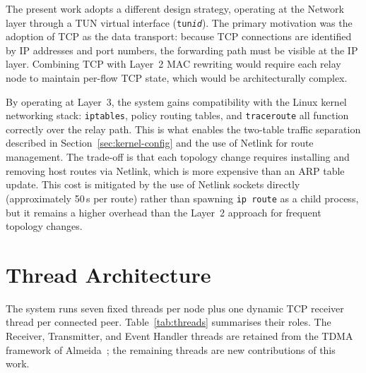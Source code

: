The present work adopts a different design strategy, operating at the Network layer through
a TUN virtual interface (\texttt{tun\textit{id}}). The primary motivation was the adoption
of TCP as the data transport: because TCP connections are identified by IP addresses and
port numbers, the forwarding path must be visible at the IP layer. Combining TCP with
Layer~2 MAC rewriting would require each relay node to maintain per-flow TCP state, which
would be architecturally complex.

By operating at Layer~3, the system gains compatibility with the Linux kernel networking
stack: \texttt{iptables}, policy routing tables, and \texttt{traceroute} all function
correctly over the relay path. This is what enables the two-table traffic separation
described in Section~\ref{sec:kernel-config} and the use of Netlink for route management.
The trade-off is that each topology change requires installing and removing host routes via
Netlink, which is more expensive than an ARP table update. This cost is mitigated by the
use of Netlink sockets directly (approximately 50\,\textmu s per route) rather than
spawning \texttt{ip route} as a child process, but it remains a higher overhead than the
Layer~2 approach for frequent topology changes.


\section{Thread Architecture}
\label{sec:threads}

The system runs seven fixed threads per node plus one dynamic TCP receiver thread per
connected peer. Table~\ref{tab:threads} summarises their roles. The Receiver, Transmitter,
and Event Handler threads are retained from the TDMA framework of
Almeida~\cite{almeida2023synchronization}; the remaining threads are new contributions of
this work.

